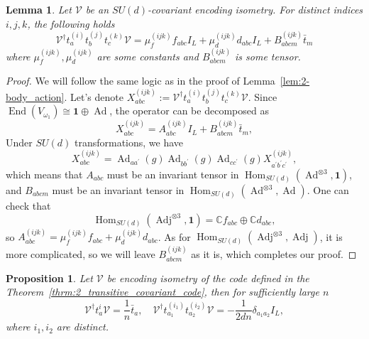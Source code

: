 \documentclass[10pt,twocolumn,superscriptaddress,aps,amsmath,amssymb,citeautoscript,floatfix,prx]{revtex4-2}
\theoremstyle{plain}
\theoremstyle{plain}
\theoremstyle{plain}
\theoremstyle{plain}
\theoremstyle{plain}
\theoremstyle{plain}
\theoremstyle{plain}
\newtheorem{smproposition}[smtheorem]{Proposition}
\newtheorem{smlemma}[smtheorem]{Lemma}
\theoremstyle{definition}
\theoremstyle{plain}
\begin{document}
\begin{appendix}
\begin{smlemma}\label{lem:3-body_action}
Let $\mathcal{V}$ be an $SU(d)$-covariant encoding isometry. For distinct indices $i, j, k$, the following holds
\[
    \mathcal{V}^{\dagger} t_a^{(i)} t_b^{(j)} t_c^{(k)} \mathcal{V}=\mu_{f}^{(ijk)} f_{a b c} I_L+\mu_{d}^{(ijk)} d_{a b c} I_L+B_{a b c m}^{(ijk)} \bar{t}_m
\]
where $\mu_{f}^{(ijk)}, \mu_{d}^{(ijk)}$ are some constants and $B_{a b c m}^{(ijk)}$ is some tensor.
\end{smlemma}

\begin{proof}
    We will follow the same logic as in the proof of Lemma~\ref{lem:2-body_action}. Let's denote $X_{a b c}^{(i j k)}:=\mathcal{V}^{\dagger} t_a^{(i)} t_b^{(j)} t_c^{(k)} \mathcal{V}$. Since $\operatorname{End}\left(V_{\omega_1}\right) \cong \mathbf{1} \oplus \operatorname{Ad}$,
    the operator can be decomposed as
    \[
        X_{abc}^{(i j k)}=A_{abc}^{(i j k)} I_L+B_{abcm}^{(i j k)} \bar{t}_m,
    \]
    Under $SU(d)$ transformations, we have
    \[
        X_{abc}^{(i j k)}=\operatorname{Ad}_{a a^{\prime}}(g) \operatorname{Ad}_{b b^{\prime}}(g) \operatorname{Ad}_{c c^{\prime}}(g) X_{a^{\prime} b^{\prime} c^{\prime}}^{(i j k)},
    \]
    which means that $A_{abc}$ must be an invariant tensor in $\operatorname{Hom}_{SU(d)}(\operatorname{Ad}^{\otimes 3}, \mathbf{1})$, and
    $B_{abcm}$ must be an invariant tensor in $\operatorname{Hom}_{SU(d)}(\operatorname{Ad}^{\otimes 3}, \operatorname{Ad})$.
    One can check that 
    $$
    \operatorname{Hom}_{S U(d)}\left(\operatorname{Adj}^{\otimes 3}, \mathbf{1}\right)=\mathbb{C} f_{a b c} \oplus \mathbb{C} d_{a b c},
    $$ 
    so $A_{abc}^{(i j k)}=\mu_{f}^{(ijk)} f_{a b c}+\mu_{d}^{(ijk)} d_{a b c}$. As for $\operatorname{Hom}_{SU(d)}\left(\operatorname{Adj}^{\otimes 3}, \operatorname{Adj}\right)$, it is more complicated, so we will leave $B_{abcm}^{(i j k)}$ as it is, which completes our proof.
\end{proof}

\begin{smproposition}\label{prop:1_and_2_body_action}
    Let $\mathcal{V}$ be encoding isometry of the code defined in the Theorem~\ref{thrm:2_transitive_covariant_code}, then for sufficiently large $n$
    \[
        \mathcal{V}^{\dagger}t^{i}_a \mathcal{V}=\frac{1}{n} \bar{t}_a, \quad \mathcal{V}^{\dagger} t_{a_1}^{\left(i_1\right)} t_{a_2}^{\left(i_2\right)} \mathcal{V}=-\frac{1}{2dn} \delta_{a_1 a_2} I_L,
    \]
    where $i_1, i_2$ are distinct.
\end{smproposition}


\end{appendix}
\end{document}
